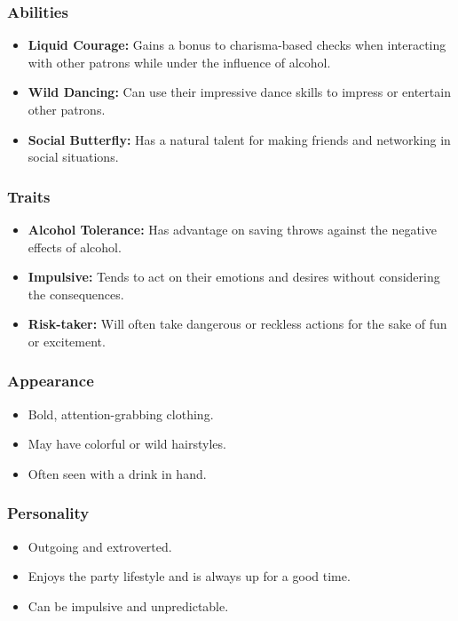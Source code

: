 \documentclass{book}
\begin{document}
\subsubsection{Abilities}
\begin{itemize}
    \item \textbf{Liquid Courage:} Gains a bonus to charisma-based checks when interacting with other patrons while under the influence of alcohol.
    \item \textbf{Wild Dancing:} Can use their impressive dance skills to impress or entertain other patrons.
    \item \textbf{Social Butterfly:} Has a natural talent for making friends and networking in social situations.
\end{itemize}
\subsubsection{Traits}
\begin{itemize}
    \item \textbf{Alcohol Tolerance:} Has advantage on saving throws against the negative effects of alcohol.
    \item \textbf{Impulsive:} Tends to act on their emotions and desires without considering the consequences.
    \item \textbf{Risk-taker:} Will often take dangerous or reckless actions for the sake of fun or excitement.
\end{itemize}

\subsubsection{Appearance}
\begin{itemize}
    \item Bold, attention-grabbing clothing.
    \item May have colorful or wild hairstyles.
    \item Often seen with a drink in hand.
\end{itemize}
\subsubsection{Personality}
\begin{itemize}
    \item Outgoing and extroverted.
    \item Enjoys the party lifestyle and is always up for a good time.
    \item Can be impulsive and unpredictable.
\end{itemize}
\end{document}

